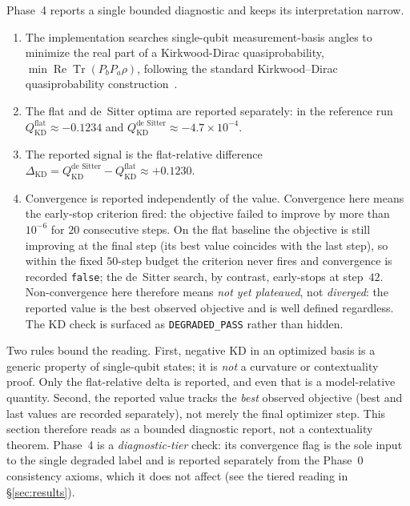 Phase~4 reports a single bounded diagnostic and keeps its interpretation narrow.

\begin{enumerate}[leftmargin=1.5em]
\item The implementation searches single-qubit measurement-basis angles to minimize the
  real part of a Kirkwood-Dirac quasiprobability,
  $\min \operatorname{Re}\operatorname{Tr}(P_b P_a \rho)$, following the standard
  Kirkwood--Dirac quasiprobability construction~\cite{Kirkwood1933,Dirac1945}.
\item The flat and de~Sitter optima are reported separately: in the reference run
  $Q^{\text{flat}}_{\mathrm{KD}} \approx -0.1234$ and
  $Q^{\text{de Sitter}}_{\mathrm{KD}} \approx -4.7\times10^{-4}$.
\item The reported signal is the flat-relative difference
  $\Delta_{\mathrm{KD}} = Q^{\text{de Sitter}}_{\mathrm{KD}} - Q^{\text{flat}}_{\mathrm{KD}}
  \approx +0.1230$.
\item Convergence is reported independently of the value. Convergence here means the
  early-stop criterion fired: the objective failed to improve by more than $10^{-6}$ for
  $20$ consecutive steps. On the flat baseline the objective is still improving at the
  final step (its best value coincides with the last step), so within the fixed $50$-step
  budget the criterion never fires and convergence is recorded \texttt{false}; the
  de~Sitter search, by contrast, early-stops at step~$42$. Non-convergence here therefore
  means \emph{not yet plateaued}, not \emph{diverged}: the reported value is the best
  observed objective and is well defined regardless. The KD check is surfaced as
  \texttt{DEGRADED\_PASS} rather than hidden.
\end{enumerate}

Two rules bound the reading. First, negative KD in an optimized basis is a generic
property of single-qubit states; it is \emph{not} a curvature or contextuality proof.
Only the flat-relative delta is reported, and even that is a model-relative quantity.
Second, the reported value tracks the \emph{best} observed objective (best and last
values are recorded separately), not merely the final optimizer step. This section
therefore reads as a bounded diagnostic report, not a contextuality theorem. Phase~4 is a
\emph{diagnostic-tier} check: its convergence flag is the sole input to the single degraded
label and is reported separately from the Phase~0 consistency axioms, which it does not
affect (see the tiered reading in \S\ref{sec:results}).
